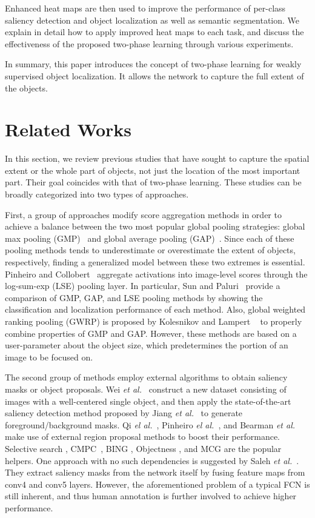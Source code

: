 \documentclass[10pt,twocolumn,letterpaper]{article}
\begin{document}
Enhanced heat maps are then used to improve the performance of per-class saliency detection and object localization as well as semantic segmentation. We explain in detail how to apply improved heat maps to each task, and discuss the effectiveness of the proposed two-phase learning through various experiments.

In summary, this paper introduces the concept of two-phase learning for weakly supervised object localization. It allows the network to capture the full extent of the objects.

\section{Related Works}
\label{sec:related_work}
In this section, we review previous studies that have sought to capture the spatial extent or the whole part of objects, not just the location of the most important part. Their goal coincides with that of two-phase learning. These studies can be broadly categorized into two types of approaches.

First, a group of approaches modify score aggregation methods in order to achieve a balance between the two most popular global pooling strategies: global max pooling (GMP)~\cite{Oquab15} and global average pooling (GAP)~\cite{zhou2016cvpr}. Since each of these pooling methods tends to underestimate or overestimate the extent of objects, respectively, finding a generalized model between these two extremes is essential.
Pinheiro and Collobert~\cite{Pinheiro2015CVPR} aggregate activations into image-level scores through the log-sum-exp (LSE) pooling layer. In particular, Sun and Paluri~\cite{SunPCNB16pro} provide a comparison of GMP, GAP, and LSE pooling methods by showing the classification and localization performance of each method. Also, global weighted ranking pooling (GWRP) is proposed by Kolesnikov and Lampert ~\cite{kolesnikov2016seed} to properly combine properties of GMP and GAP. However, these methods are based on a user-parameter about the object size, which predetermines the portion of an image to be focused on.


The second group of methods employ external algorithms to obtain saliency masks or object proposals. Wei \textit{et al.}~\cite{Wei15stc} construct a new dataset consisting of images with a well-centered single object, and then apply the state-of-the-art saliency detection method proposed by Jiang \textit{et al.}~\cite{JiangWYWZL13drfi} to generate foreground/background masks. Qi \textit{el al.}~\cite{QiLSZJ16aug}, Pinheiro \textit{el al.}~\cite{Pinheiro2015CVPR}, and Bearman \textit{et al.}~\cite{BearmanRFL16wtp} make use of external region proposal methods to boost their performance. Selective search \cite{UijlingsSGS13ss}, CMPC~\cite{carreira2012pami}, BING \cite{ChengZLT14bing}, Objectness \cite{AlexeDF12obj}, and MCG \cite{ArbelaezPBMM14mcg} are the popular helpers. One approach with no such dependencies is suggested by  Saleh \textit{et al.}~\cite{SalehASPGA16builtin}. They extract saliency masks from the network itself by fusing feature maps from conv4 and conv5 layers. However, the aforementioned problem of a typical FCN is still inherent, and thus human annotation is further involved to achieve higher performance.
\end{document}
